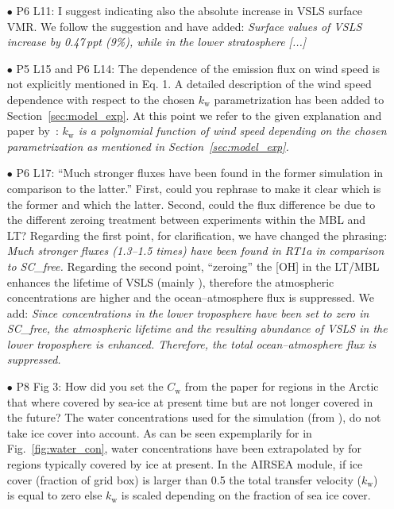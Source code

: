 \begin{itemize}
\begin{itemize}
\item[$\bullet$]{\color{blue}P6 L11: I suggest indicating also the absolute increase in VSLS surface VMR.}
  We follow the suggestion and have added: \emph{Surface values of VSLS increase by 0.47\,\unit{ppt} (9\%), while in the lower stratosphere [...]}
\item[$\bullet$]{\color{blue}P5 L15 and P6 L14: The dependence of the emission flux on wind speed is not explicitly mentioned in Eq. 1.}
  A detailed description of the wind speed dependence with respect to the chosen $k_\mathrm{w}$ parametrization has been added to Section~\ref{sec:model_exp}. At this point we refer to the given explanation and paper by~\citet{ACP:Lennartz2015}: \emph{$k_\mathrm{w}$ is a polynomial function of wind speed depending on the chosen parametrization as mentioned in Section~\ref{sec:model_exp}.}
\item[$\bullet$]{\color{blue}P6 L17: ``Much stronger fluxes have been found in the former simulation in comparison to the latter.'' First, could you rephrase to make it clear which is the former and which the latter. Second, could the flux difference be due to the different  zeroing treatment between experiments within the MBL and LT?}
  Regarding the first point, for clarification, we have changed the phrasing: \emph{Much stronger fluxes (1.3--1.5 times) have been found in RT1a in comparison to SC\_free.} Regarding the second point, ``zeroing'' the [OH] in the LT/MBL enhances the lifetime of VSLS (mainly ), therefore the atmospheric concentrations are higher and the ocean--atmosphere flux is suppressed. We add: \emph{Since  concentrations in the lower troposphere have been set to zero in SC\_free, the atmospheric lifetime and the resulting abundance of VSLS in the lower troposphere is enhanced. Therefore, the total ocean--atmosphere flux is suppressed.}
\item[$\bullet$]{\color{blue}P8 Fig 3: How did you set the $C_\mathrm{w}$ from the \citet{ACP:Ziska2013} paper for regions in the Arctic that where covered by sea-ice at present time but are not longer covered in the future?}
  The water concentrations used for the simulation (from \citet{ACP:Ziska2013}), do not take ice cover into account. As can be seen expemplarily for  in Fig.~\ref{fig:water_con}, water concentrations have been extrapolated by \citet{ACP:Ziska2013} for regions typically covered by ice at present. In the AIRSEA module, if ice cover (fraction of grid box) is larger than 0.5 the total transfer velocity ($k_\mathrm{w}$) is equal to zero else $k_\mathrm{w}$ is scaled depending on the fraction of sea ice cover.

\end{itemize}
\end{itemize}
